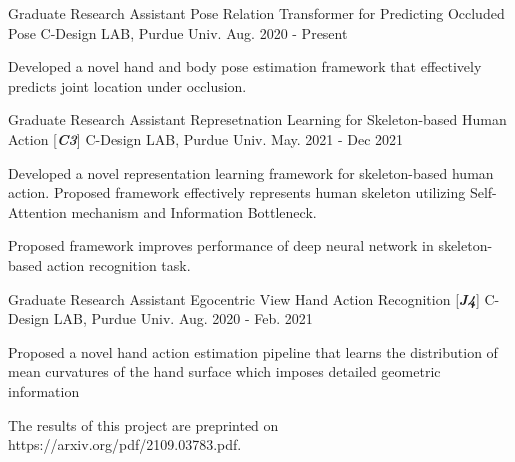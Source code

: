 

\begin{cventries}

\cventry
{Graduate Research Assistant} %
{Pose Relation Transformer for Predicting Occluded Pose} %
{C-Design LAB, Purdue Univ.} %
{Aug. 2020 - Present} %
{ %
\begin{cvitems}
\item {Developed a novel hand and body pose estimation framework that effectively predicts joint location under occlusion.}
\end{cvitems}
}


\cventry
{Graduate Research Assistant} %
{Represetnation Learning for Skeleton-based Human Action [\textit{\textbf{C3}}]} %
{C-Design LAB, Purdue Univ.} %
{May. 2021 - Dec 2021} %
{ %
\begin{cvitems}
\item {Developed a novel representation learning framework for skeleton-based human action. Proposed framework effectively represents human skeleton utilizing Self-Attention mechanism and Information Bottleneck.}
\item {Proposed framework improves performance of deep neural network in skeleton-based action recognition task.}
\end{cvitems}
}

\cventry
{Graduate Research Assistant} %
{Egocentric View Hand Action Recognition [\textit{\textbf{J4}}]} %
{C-Design LAB, Purdue Univ.} %
{Aug. 2020 - Feb. 2021} %
{ %
\begin{cvitems}
\item {Proposed a novel hand action estimation pipeline that learns the distribution of mean curvatures of the hand surface which imposes detailed geometric information}
\item {The results of this project are preprinted on https://arxiv.org/pdf/2109.03783.pdf.}
\end{cvitems}
}


\end{cventries}
